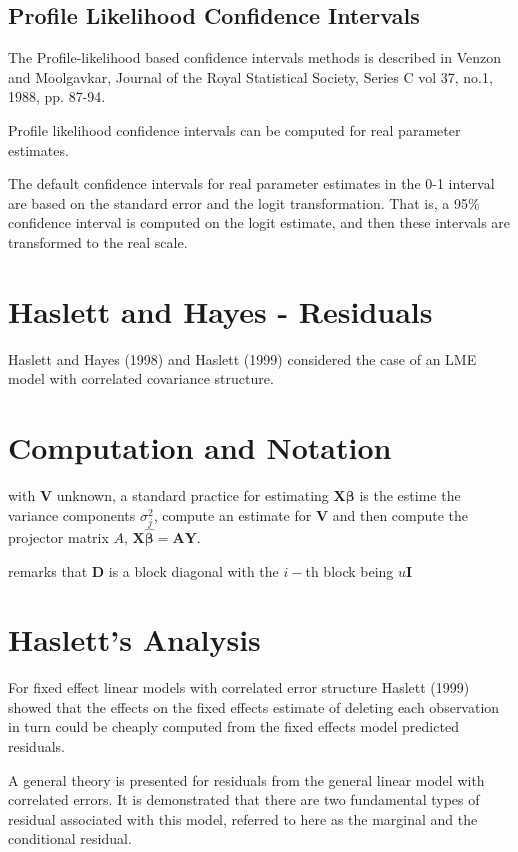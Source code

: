 \documentclass[Main.tex]{subfiles}
\begin{document}
\subsection{Profile Likelihood Confidence Intervals}
The Profile-likelihood based confidence intervals methods is described in Venzon and Moolgavkar, Journal of the Royal Statistical Society, Series C vol 37, no.1, 1988, pp. 87-94. 

Profile likelihood confidence intervals can be computed for real parameter estimates.

The default confidence intervals for real parameter estimates in the 0-1 interval are based on the standard error and the logit transformation.  
That is, a 95\% confidence interval is computed on the logit estimate, and then these intervals are transformed to the real scale.  








\section*{Haslett and Hayes - Residuals}
Haslett and Hayes (1998) and Haslett (1999) considered the case of an LME model with correlated covariance structure.


\section{Computation and Notation } %
with $\boldsymbol{V}$ unknown, a standard practice for estimating $\boldsymbol{X \beta}$ is the estime the variance components $\sigma^2_j$,
compute an estimate for $\boldsymbol{V}$ and then compute the projector matrix $A$, $\boldsymbol{X \hat{\beta}}  = \boldsymbol{AY}$.


\citet{Zewotir} remarks that $\boldsymbol{D}$ is a block diagonal with the $i-$th block being $u \boldsymbol{I}$

\section{Haslett's Analysis} %
For fixed effect linear models with correlated error structure Haslett (1999) showed that the effects on
the fixed effects estimate of deleting each observation in turn could be cheaply computed from the fixed effects model predicted residuals.

A general theory is presented for residuals from the general linear model with correlated errors.
It is demonstrated that there are two fundamental types of residual associated with this model, referred to here as the marginal and the conditional residual.
\end{document}
